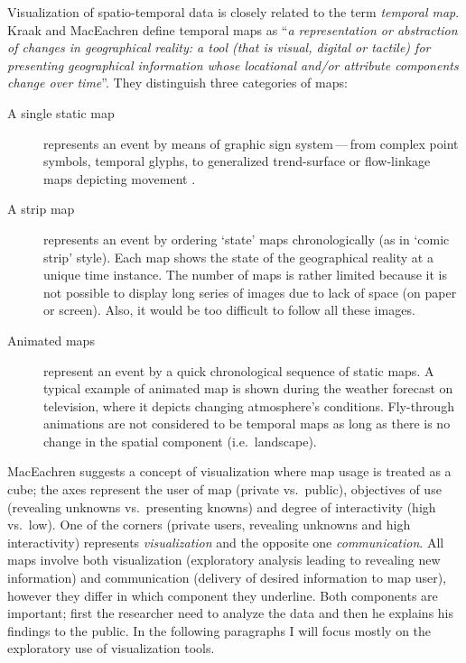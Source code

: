 \documentclass[a4paper,12pt,oneside]{book}
\newcommand{\dash}{\mbox{\,---\,}}
\begin{document}
Visualization of spatio-temporal data is closely related to the term \emph{temporal map}.
Kraak and MacEachren \cite{kraak1994visualization} define temporal maps as
``\emph{a representation or abstraction of changes in geographical reality:
a tool (that is visual, digital or tactile) for presenting geographical information
whose locational and/or attribute components change over time}''.
They distinguish three categories of maps:
    \begin{description}
        \item[A single static map] represents an event by means of graphic sign system\dash from complex point symbols,
            temporal glyphs, to generalized trend-surface or flow-linkage maps depicting movement \cite{monmonier1990strategies}.

        \item[A strip map] represents an event by ordering `state' maps chronologically (as in `comic strip' style).
            Each map shows the state of the geographical reality at a unique time instance.
            The number of maps is rather limited because it is not possible to display long series of images
            due to lack of space (on paper or screen). Also, it would be too difficult to follow all these images.

        \item[Animated maps] represent an event by a quick chronological sequence of static maps.
            A typical example of animated map is shown during the weather forecast on television,
            where it depicts changing atmosphere's conditions.
            Fly-through animations are not considered to be temporal maps
            as long as there is no change in the spatial component (i.e.\ landscape).
    \end{description}

MacEachren \cite{maceachren1997exploratory} suggests a concept of visualization
where map usage is treated as a cube;
the axes represent the user of map (private vs.\ public),
objectives of use (revealing unknowns vs.\ presenting knowns)
and degree of interactivity (high vs.\ low).
One of the corners (private users, revealing unknowns and high interactivity)
represents \emph{visualization} and the opposite one \emph{communication}.
All maps involve both visualization (exploratory analysis leading to revealing new information)
and communication (delivery of desired information to map user),
however they differ in which component they underline.
Both components are important; first the researcher need to analyze the data
and then he explains his findings to the public.
In the following paragraphs I will focus mostly on the exploratory use of visualization tools.
\end{document}
